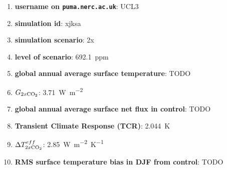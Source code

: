 \documentclass{article}
\begin{document}
\begin{enumerate}
    \item \textbf{username on \texttt{puma.nerc.ac.uk}}: UCL3
    \item \textbf{simulation id}: xjksa
    \item \textbf{simulation scenario}: 2x
    \item \textbf{ level of scenario}: \SI{692.1}{ppm}
    \item \textbf{global annual average surface temperature}: TODO
    \item \textbf{$G_{2x\ce{CO2}}$}: \SI{3.71}{W.m^{-2}}
    \item \textbf{global annual average surface net flux in control}: TODO
    \item \textbf{Transient Climate Response (TCR)}: \SI{2.044}{K}
    \item \textbf{$\Delta T^{eff}_{2x\ce{CO2}}$}: \SI{2.85}{W.m^{-2}.K^{-1}}
    \item \textbf{RMS surface temperature bias in DJF from control}: TODO
\end{enumerate}
\end{document}
